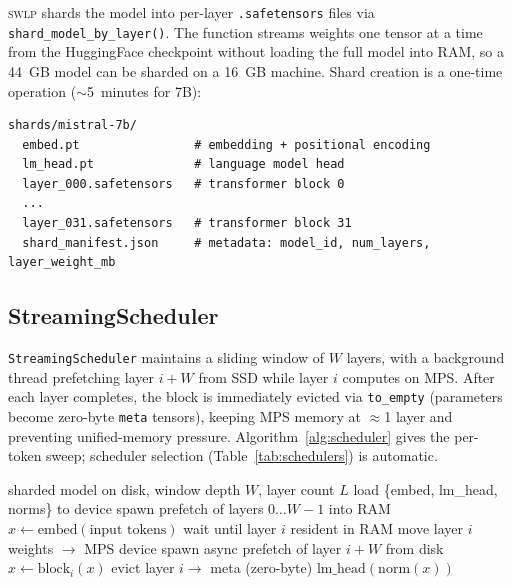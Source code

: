 \documentclass[10pt,a4paper]{article}
\newcommand{\swlp}{\textsc{swlp}}
\begin{document}
\swlp{} shards the model into per-layer \texttt{.safetensors}
\cite{huggingface2022safetensors} files via \texttt{shard\_model\_by\_layer()}.
The function streams weights one tensor at a time from the HuggingFace checkpoint
without loading the full model into RAM, so a 44~GB model can be sharded on a
16~GB machine. Shard creation is a one-time operation ($\sim$5~minutes for 7B):

\begin{lstlisting}
shards/mistral-7b/
  embed.pt                # embedding + positional encoding
  lm_head.pt              # language model head
  layer_000.safetensors   # transformer block 0
  ...
  layer_031.safetensors   # transformer block 31
  shard_manifest.json     # metadata: model_id, num_layers, layer_weight_mb
\end{lstlisting}

\subsection{StreamingScheduler}
\label{subsec:scheduler}

\texttt{StreamingScheduler} maintains a sliding window of $W$ layers, with a
background thread prefetching layer $i+W$ from SSD while layer $i$ computes on
MPS. After each layer completes, the block is immediately evicted via
\texttt{to\_empty} (parameters become zero-byte \texttt{meta} tensors), keeping
MPS memory at $\approx$1 layer and preventing unified-memory pressure.
Algorithm~\ref{alg:scheduler} gives the per-token sweep; scheduler selection
(Table~\ref{tab:schedulers}) is automatic.

\begin{algorithm}[htbp]
\caption{StreamingScheduler: one decode-step layer sweep}
\label{alg:scheduler}
\begin{algorithmic}[1]
\Require sharded model on disk, window depth $W$, layer count $L$
\State load \{embed, lm\_head, norms\} to device 
\State spawn prefetch of layers $0 \ldots W{-}1$ into RAM 
\State $x \gets \text{embed}(\text{input tokens})$
  \State wait until layer $i$ resident in RAM
  \State move layer $i$ weights $\to$ MPS device
  \State spawn async prefetch of layer $i{+}W$ from disk 
  \State $x \gets \text{block}_i(x)$ 
  \State evict layer $i \to$ meta (zero-byte) 
\EndFor
\State \Return $\text{lm\_head}(\text{norm}(x))$
\end{algorithmic}
\end{algorithm}
\end{document}
